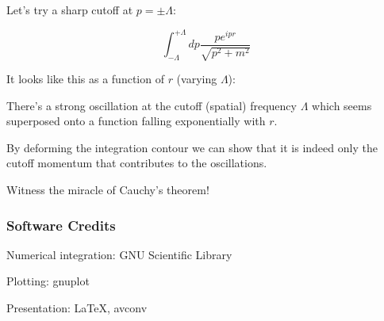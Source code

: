\documentclass{beamer}
\newcommand{\integrand}{\frac{p e^{ipr}}{\sqrt{p^2 + m^2}}}
\begin{document}


\begin{frame}
Let's try a sharp cutoff at $p = \pm \Lambda$:

$$\int_{-\Lambda}^{+\Lambda} dp \integrand$$

It looks like this as a function of $r$ (varying $\Lambda$):
\end{frame}



\begin{frame}
There's a strong oscillation at the cutoff (spatial) frequency $\Lambda$
which seems superposed onto a function falling exponentially with $r$.

By deforming the integration contour we can show that it is indeed only
the cutoff momentum that contributes to the oscillations.

Witness the miracle of Cauchy's theorem!
\end{frame}







\begin{frame}
\frametitle{Software Credits}

Numerical integration: GNU Scientific Library

Plotting: gnuplot

Presentation: \LaTeX, avconv
\end{frame}
\end{document}
